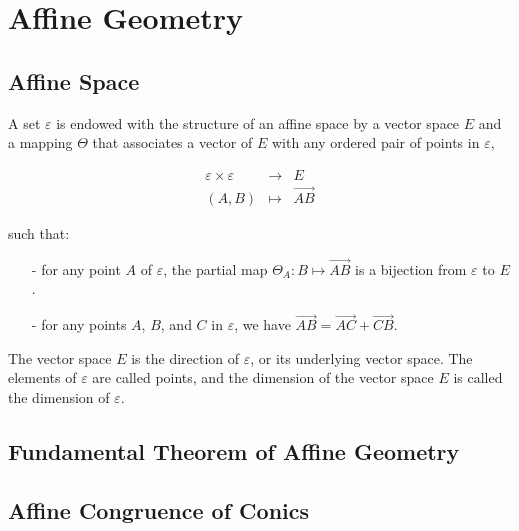 \chapter{Affine Geometry}

\section{Affine Space}

\begin{definition}
  A set $\varepsilon$ is endowed with the structure of an affine space by a vector space $E$ and
  a mapping $\Theta$ that associates a vector of $E$ with any ordered pair of points in
  $\varepsilon$,

  \begin{eqnarray*}
    \varepsilon \times \varepsilon &\longrightarrow & E \\
    (A,B) &\longmapsto & \overrightarrow{AB}
  \end{eqnarray*}

  such that:

  \begin{itemize}
    \item[-]{for any point $A$ of $\varepsilon$, the partial map $\Theta_A : B \mapsto
        \overrightarrow{AB}$ is a bijection from $\varepsilon$ to $E$.}
    \item[-]{for any points $A$, $B$, and $C$ in $\varepsilon$, we have $\overrightarrow{AB}=
        \overrightarrow{AC}+\overrightarrow{CB}$.}
  \end{itemize}

  The vector space $E$ is the direction of $\varepsilon$, or its underlying vector space. The
  elements of $\varepsilon$ are called points, and the dimension of the vector space $E$ is
  called the dimension of $\varepsilon$. \cite{audin}\\
\end{definition}

\section{Fundamental Theorem of Affine Geometry}

\section{Affine Congruence of Conics}
